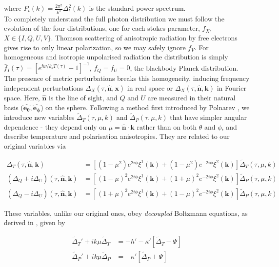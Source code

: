 \documentclass[a4paper,10pt]{article}
\renewcommand{\v}[1]{\mathbf{#1}}
\newcommand{\unit}[1]{\hat{\v{#1}}}
\begin{document}
where $P_t(k) = \frac{2\pi^2}{k^3}\Delta_t^2(k)$ is the standard power spectrum.\\

To completely understand the full photon distribution we must follow the evolution of the four distributions, one for each stokes parameter, $f_X$, $X\in\{I,Q,U,V\}$. Thomson scattering of anisotropic radiation by free electrons gives rise to only linear polarization, so we may safely ignore $f_V$. For homogeneous and isotropic unpolarised radiation the distribution is simply $\bar{f}_I(\tau)= [e^{\hbar \nu/k_b T(\tau)}-1]^{-1}$, $f_Q=f_U=0$, the blackbody Planck distribution. The presence of metric perturbations breaks this homogeneity, inducing frequency independent perturbations $\Delta_X(\tau,\unit{n},\v{x})$ in real space or $\Delta_X(\tau,\unit{n},\v{k})$ in Fourier space. Here, $\unit{n}$ is the line of sight, and $Q$ and $U$ are measured in their natural basis ($\unit{e_\theta}, \unit{e_\phi}$) on the sphere. Following a method first introduced by Polnarev \cite{Polnarev}, we introduce new variables $\tilde{\Delta}_T(\tau,\mu,k)$ and $\tilde{\Delta}_P(\tau,\mu,k)$ that have simpler angular dependence - they depend only on $\mu=\unit{n}\cdot\v{k}$ rather than on both $\theta$  and $\phi$, and describe temperature and polarisation anisotropies. They are related to our original variables via

\begin{equation}\begin{split}
\Delta_T(\tau,\unit{n},\v{k}) &= [(1-\mu^2) e^{2i\phi} \xi^1(\v{k})+(1-\mu^2) e^{-2i\phi} \xi^2(\v{k})]\tilde{\Delta}_T(\tau,\mu,k)\\
(\Delta_Q+i\Delta_U)(\tau,\unit{n},\v{k}) &=[(1-\mu)^2 e^{2i\phi} \xi^1(\v{k})+(1+\mu)^2 e^{-2i\phi} \xi^2(\v{k})]\tilde{\Delta}_P(\tau,\mu,k) \\
(\Delta_Q-i\Delta_U)(\tau,\unit{n},\v{k}) &=[(1+\mu)^2 e^{2i\phi} \xi^1(\v{k})+(1-\mu)^2 e^{-2i\phi} \xi^2(\v{k})]\tilde{\Delta}_P(\tau,\mu,k)
\end{split}\end{equation}

These variables, unlike our original ones, obey \textit{decoupled} Boltzmann equations, as derived in \cite{Kowosky}, given by

\begin{equation}\begin{split}
\tilde{\Delta}_T'+ik\mu \tilde{\Delta}_T &= -h' -\kappa'[\tilde{\Delta}_T - \Psi]\\
\tilde{\Delta}_P'+ik\mu\tilde{\Delta}_P &= -\kappa'[\tilde{\Delta}_P + \Psi]
\end{split}
\label{Boltzmann}\end{equation}
\end{document}
